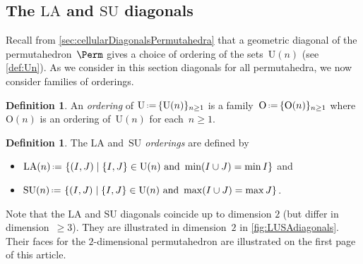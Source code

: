 \documentclass{amsart}
\newcommand{\darkblue}{\color{darkblue}} %
\theoremstyle{definition}
\newtheorem{definition}[theorem]{Definition}
\newcommand{\Un}{\mathrm{U}} %
\newcommand{\Or}{\mathrm{O}} %
\newcommand{\set}[2]{\left\{ #1 \;\middle|\; #2 \right\}} %
\newcommand{\eqdef}{\mbox{\,\raisebox{0.2ex}{\scriptsize\ensuremath{\mathrm:}}\ensuremath{=}\,}} %
\newcommand{\defn}[1]{\textsl{\darkblue #1}} %
\newcommand{\SU}{\mathrm{SU}}
\newcommand{\LA}{\mathrm{LA}}
\begin{document}

\subsection{The $\LA$ and $\SU$ diagonals}
\label{subsec:LASUdiagonal}

Recall from \cref{sec:cellularDiagonalsPermutahedra} that a geometric diagonal of the permutahedron~$\Perm$ gives a choice of ordering of the sets~$\Un(n)$ (see \cref{def:Un}).
As we consider in this section diagonals for all permutahedra, we now consider families of orderings.

\begin{definition}
An \defn{ordering} of $\Un \eqdef \{\Un(n)\}_{n \ge 1}$ is a family~$\Or \eqdef \{\Or(n)\}_{n \ge 1}$ where~$\Or(n)$ is an ordering of~$\Un(n)$ for each~$n \ge 1$.
\end{definition}

\begin{definition}
The \defn{$\LA$} and~\defn{$\SU$ orderings} are defined by
\begin{itemize} 
	\item $\LA(n) \eqdef \set{(I,J)}{\{I,J\} \in \Un(n) \text{ and } \min(I\cup J) = \min I}$ and
	\item $\SU(n) \eqdef \set{(I,J)}{\{I,J\} \in \Un(n) \text{ and } \max(I\cup J) = \max J}$.
\end{itemize}
\end{definition}

Note that the $\LA$ and $\SU$ diagonals coincide up to dimension $2$ (but differ in dimension~$\ge 3$).
They are illustrated in dimension~$2$ in \cref{fig:LUSAdiagonals}.
Their faces for the $2$-dimensional permutahedron are illustrated on the first page of this article.  
\end{document}
